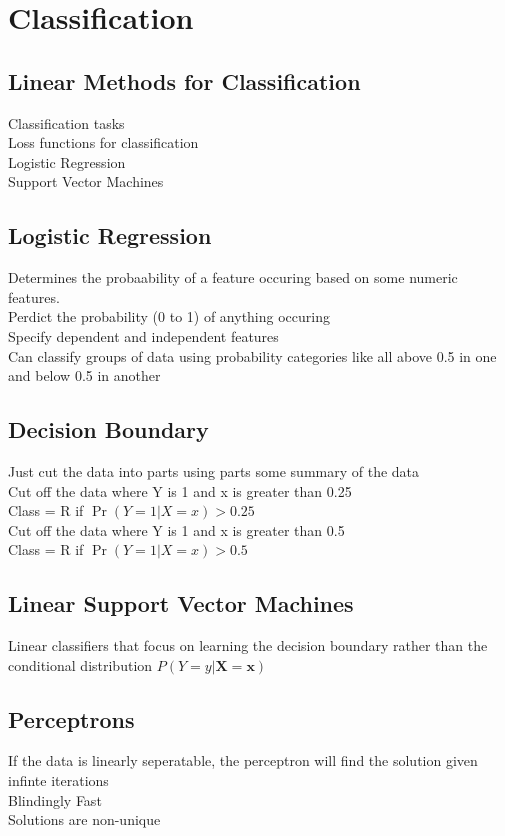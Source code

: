 \documentclass[10pt,landscape,a4paper]{cheatsheet}
\newcommand{\x}{\mathbf{x}}
\begin{document}
   \section{Classification}
   
   \subsection{Linear Methods for Classification}
   Classification tasks\\
   Loss functions for classification\\
   Logistic Regression\\
   Support Vector Machines\\

   \subsection{Logistic Regression}
   Determines the probaability of a feature occuring based on some numeric features.\\
   Perdict the probability (0 to 1) of anything occuring\\
   Specify dependent and independent features\\
   Can classify groups of data using probability categories like all above 0.5 in one and below 0.5 in another

   \subsection{Decision Boundary}
   Just cut the data into parts using parts some summary of the data\\
   Cut off the data where Y is 1 and x is greater than 0.25\\
   Class = R if $\Pr(Y=1|X=x) > 0.25$\\
   
   Cut off the data where Y is 1 and x is greater than 0.5\\
   Class = R if $\Pr(Y=1|X=x) > 0.5$\\

   \subsection{Linear Support Vector Machines}
   Linear classifiers that focus on learning the decision
    boundary rather than the conditional distribution
    $P(Y=y|\mathbf{X}=\x)$

  \subsection{Perceptrons}
  If the data is linearly seperatable, the perceptron will find the solution given infinte iterations\\
  Blindingly Fast\\
  Solutions are non-unique\\
\end{document}
